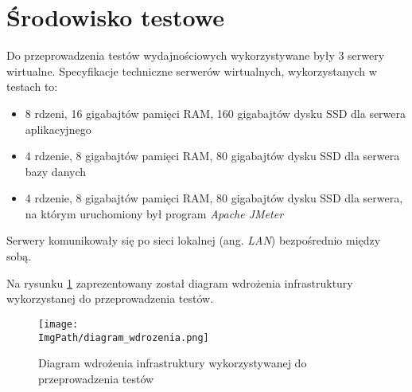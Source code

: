 \section{Środowisko testowe}
Do przeprowadzenia testów wydajnościowych wykorzystywane były 3 serwery wirtualne. Specyfikacje techniczne serwerów wirtualnych, wykorzystanych w testach to: 
\begin{itemize}
    \item 8 rdzeni, 16 gigabajtów pamięci RAM, 160 gigabajtów dysku SSD dla serwera aplikacyjnego
    \item 4 rdzenie, 8 gigabajtów pamięci RAM, 80 gigabajtów dysku SSD dla serwera bazy danych 
    \item 4 rdzenie, 8 gigabajtów pamięci RAM, 80 gigabajtów dysku SSD dla serwera, na którym uruchomiony był program \textsl{Apache JMeter}
\end{itemize}
Serwery komunikowały się po sieci lokalnej (ang. \textsl{LAN}) bezpośrednio między sobą.

Na rysunku \ref{fig:deployment_diagram} zaprezentowany został diagram wdrożenia infrastruktury wykorzystanej do przeprowadzenia testów.
\begin{figure}[!ht]
\centering
\texttt{[image: \\ImgPath/diagram\_wdrozenia.png]}
\caption{Diagram wdrożenia infrastruktury wykorzystywanej do przeprowadzenia testów}
\label{fig:deployment_diagram}
\end{figure}

